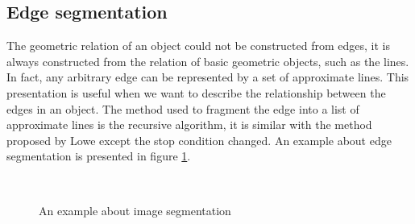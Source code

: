 \subsection{Edge segmentation}
The geometric relation of an object could not be constructed from edges, it is always constructed from the relation of basic geometric objects, such as the lines.  In fact, any arbitrary edge can be represented by a set of approximate lines. This presentation is useful when we want to describe the relationship between the edges in an object. The method used to fragment the edge into a list of approximate lines is the recursive algorithm\cite{thacker1995assessing}, it is similar with the method proposed by Lowe\cite{lowe1987three} except the stop condition changed. An example about edge segmentation is presented in figure \ref{fig:figure_22}.
\begin{figure}[h!]
\centering
{}~~
\caption{An example about image segmentation}
\label{fig:figure_22}
\end{figure}

